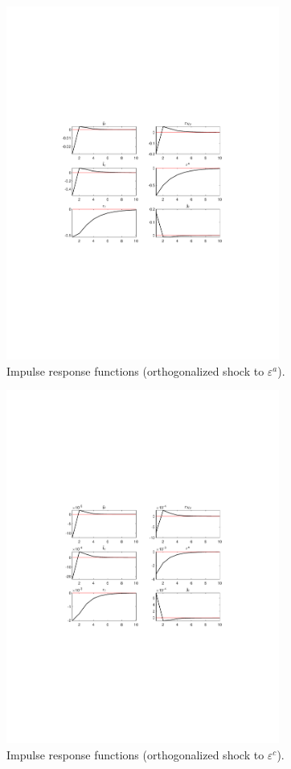  
\begin{figure}[H]
\centering 
\includegraphics[width=0.80\textwidth]{nash/graphs/nash_IRF_eps_a}
\caption{Impulse response functions (orthogonalized shock to ${\varepsilon^a}$).}
\label{Fig:IRF:eps_a}
\end{figure}
 
\begin{figure}[H]
\centering 
\includegraphics[width=0.80\textwidth]{nash/graphs/nash_IRF_eps_c_star}
\caption{Impulse response functions (orthogonalized shock to ${\varepsilon^c}$).}
\label{Fig:IRF:eps_c_star}
\end{figure}
 
